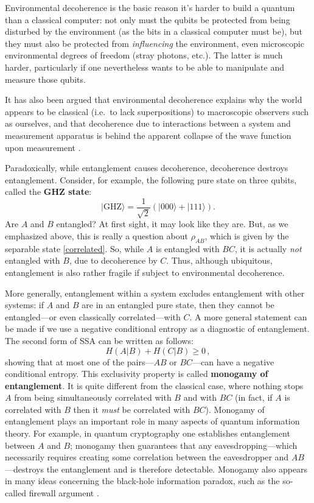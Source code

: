 \documentclass[11pt]{article}
\newcommand{\ket}[1]{|{#1}\rangle}
\begin{document}
Environmental decoherence is the basic reason it's harder to build a quantum than a classical computer: not only must the qubits be protected from being disturbed by the environment (as the bits in a classical computer must be), but they must also be protected from \emph{influencing} the environment, even microscopic environmental degrees of freedom (stray photons, etc.). The latter is much harder, particularly if one nevertheless wants to be able to manipulate and measure those qubits.

It has also been argued that environmental decoherence explains why the world appears to be classical (i.e.\ to lack superpositions) to macroscopic observers such as ourselves, and that decoherence due to interactions between a system and measurement apparatus is behind the apparent collapse of the wave function upon measurement \cite{Zurek}.

Paradoxically, while entanglement causes decoherence, decoherence destroys entanglement. Consider, for example, the following pure state on three qubits, called the \textbf{GHZ state}:
\begin{equation}\label{GHZ}
\ket{\text{GHZ}} = \frac1{\sqrt2}\left(\ket{000}+\ket{111}\right).
\end{equation}
Are $A$ and $B$ entangled? At first sight, it may look like they are. But, as we emphasized above, this is really a question about $\rho_{AB}$, which is given by the separable state \eqref{correlated}. So, while $A$ is entangled with $BC$, it is actually \emph{not} entangled with $B$, due to decoherence by $C$. Thus, although ubiquitous, entanglement is also rather fragile if subject to environmental decoherence.

More generally, entanglement within a system excludes entanglement with other systems: if $A$ and $B$ are in an entangled pure state, then they cannot be entangled---or even classically correlated---with $C$. A more general statement can be made if we use a negative conditional entropy as a diagnostic of entanglement. The second form of SSA can be written as follows:
\begin{equation}
H(A|B)+H(C|B)\ge0\,,
\end{equation}
showing that at most one of the pairs---$AB$ or $BC$---can have a negative conditional entropy. This exclusivity property is called \textbf{monogamy of entanglement}. It is quite different from the classical case, where nothing stops $A$ from being simultaneously correlated with $B$ and with $BC$ (in fact, if $A$ is correlated with $B$ then it \emph{must} be correlated with $BC$). Monogamy of entanglement plays an important role in many aspects of quantum information theory. For example, in quantum cryptography one establishes entanglement between $A$ and $B$; monogamy then guarantees that any eavesdropping---which necessarily requires creating some correlation between the eavesdropper and $AB$---destroys the entanglement and is therefore detectable. Monogamy also appears in many ideas concerning the black-hole information paradox, such as the so-called firewall argument \cite{Mathur:2009hf,Almheiri:2012rt}.
\end{document}
